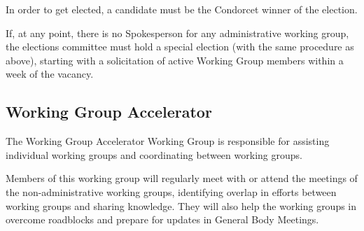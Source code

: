 \documentclass{article}
\begin{document}
In order to get elected, a candidate must be the Condorcet winner of the election. 

If, at any point, there is no Spokesperson for any administrative working group, the elections committee must hold a special election (with the same procedure as above), starting with a solicitation of active Working Group members within a week of the vacancy.

\subsection{Working Group Accelerator}

The Working Group Accelerator Working Group is responsible for assisting individual working groups and coordinating between working groups.

Members of this working group will regularly meet with or attend the meetings of the non-administrative working groups, identifying overlap in efforts between working groups and sharing knowledge. They will also help the working groups in overcome roadblocks and prepare for updates in General Body Meetings.





\end{document}

